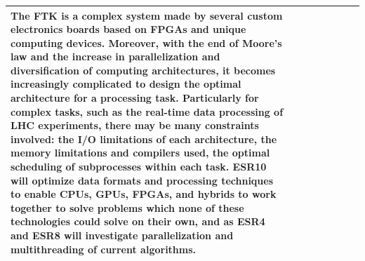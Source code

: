 \begin{center}
{\begin{tabular}{p{7mm}p{30mm}p{35mm}p{5mm}p{5mm}p{35mm}p{17mm}p{17mm}}
{The FTK is a complex system made by several custom electronics boards based on FPGAs and unique computing devices.  %
Moreover, with the end of Moore's law and the increase in parallelization and diversification of computing architectures, it becomes increasingly complicated to design the optimal architecture for a processing task. 
Particularly for complex tasks, such as the real-time data processing of LHC experiments, there may be many constraints involved: the I/O limitations of each architecture, the memory limitations and compilers used, the optimal scheduling of subprocesses within each task. 
ESR10 will optimize data formats and processing techniques to enable CPUs, GPUs, FPGAs, and hybrids to work together to solve problems which none of these technologies could solve on their own, and as ESR4 and ESR8 will investigate parallelization and multithreading of current algorithms.
} \tabularnewline \hline \midrule


\end{tabular}}
\end{center}
